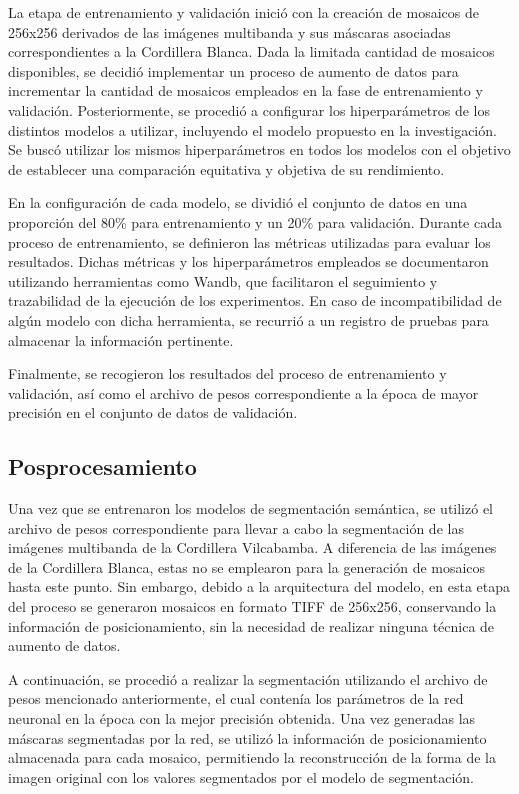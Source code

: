 La etapa de entrenamiento y validación inició con la creación de mosaicos de 256x256 derivados de las imágenes multibanda y sus máscaras asociadas correspondientes a la Cordillera Blanca. Dada la limitada cantidad de mosaicos disponibles, se decidió implementar un proceso de aumento de datos para incrementar la cantidad de mosaicos empleados en la fase de entrenamiento y validación. Posteriormente, se procedió a configurar los hiperparámetros de los distintos modelos a utilizar, incluyendo el modelo propuesto en la investigación. Se buscó utilizar los mismos hiperparámetros en todos los modelos con el objetivo de establecer una comparación equitativa y objetiva de su rendimiento.

En la configuración de cada modelo, se dividió el conjunto de datos en una proporción del 80\% para entrenamiento y un 20\% para validación. Durante cada proceso de entrenamiento, se definieron las métricas utilizadas para evaluar los resultados. Dichas métricas y los hiperparámetros empleados se documentaron utilizando herramientas como Wandb, que facilitaron el seguimiento y trazabilidad de la ejecución de los experimentos. En caso de incompatibilidad de algún modelo con dicha herramienta, se recurrió a un registro de pruebas para almacenar la información pertinente.

Finalmente, se recogieron los resultados del proceso de entrenamiento y validación, así como el archivo de pesos correspondiente a la época de mayor precisión en el conjunto de datos de validación.
 
\subsection{Posprocesamiento}

Una vez que se entrenaron los modelos de segmentación semántica, se utilizó el archivo de pesos correspondiente para llevar a cabo la segmentación de las imágenes multibanda de la Cordillera Vilcabamba. A diferencia de las imágenes de la Cordillera Blanca, estas no se emplearon para la generación de mosaicos hasta este punto. Sin embargo, debido a la arquitectura del modelo, en esta etapa del proceso se generaron mosaicos en formato TIFF de 256x256, conservando la información de posicionamiento, sin la necesidad de realizar ninguna técnica de aumento de datos.

A continuación, se procedió a realizar la segmentación utilizando el archivo de pesos mencionado anteriormente, el cual contenía los parámetros de la red neuronal en la época con la mejor precisión obtenida. Una vez generadas las máscaras segmentadas por la red, se utilizó la información de posicionamiento almacenada para cada mosaico, permitiendo la reconstrucción de la forma de la imagen original con los valores segmentados por el modelo de segmentación.


